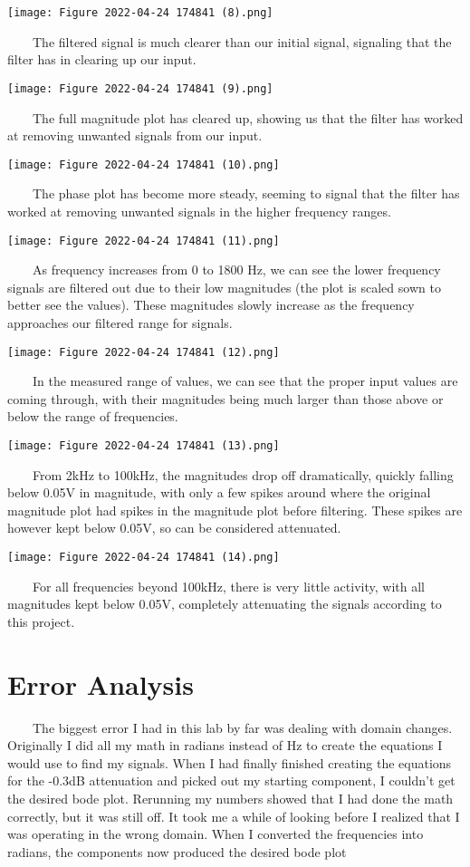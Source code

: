 \documentclass[11pt,a4]{article}
\begin{document}
\texttt{[image: Figure 2022-04-24 174841 (8).png]}

\ \ \ \ The filtered signal is much clearer than our initial signal, signaling that the filter has in clearing up our input.

\texttt{[image: Figure 2022-04-24 174841 (9).png]}

\ \ \ \ The full magnitude plot has cleared up, showing us that the filter has worked at removing unwanted signals from our input.

\texttt{[image: Figure 2022-04-24 174841 (10).png]}

\ \ \ \ The phase plot has become more steady, seeming to signal that the filter has worked at removing unwanted signals in the higher frequency ranges.

\texttt{[image: Figure 2022-04-24 174841 (11).png]}

\ \ \ \ As frequency increases from 0 to 1800 Hz, we can see the lower frequency signals are filtered out due to their low magnitudes (the plot is scaled sown to better see the values). These magnitudes slowly increase as the frequency approaches our filtered range for signals.

\texttt{[image: Figure 2022-04-24 174841 (12).png]}

\ \ \ \ In the measured range of values, we can see that the proper input values are coming through, with their magnitudes being much larger than those above or below the range of frequencies.

\texttt{[image: Figure 2022-04-24 174841 (13).png]}

\ \ \ \ From 2kHz to 100kHz, the magnitudes drop off dramatically, quickly falling below 0.05V in magnitude, with only a few spikes around where the original magnitude plot had spikes in the magnitude plot before filtering. These spikes are however kept below 0.05V, so can be considered attenuated.

\texttt{[image: Figure 2022-04-24 174841 (14).png]}

\ \ \ \ For all frequencies beyond 100kHz, there is very little activity, with all magnitudes kept below 0.05V, completely attenuating the signals according to this project.


\section{Error Analysis}

\ \ \ \ The biggest error I had in this lab by far was dealing with domain changes. Originally I did all my math in radians instead of Hz to create the equations I would use to find my signals. When I had finally finished creating the equations for the -0.3dB attenuation and picked out my starting component, I couldn't get the desired bode plot. Rerunning my numbers showed that I had done the math correctly, but it was still off. It took me a while of looking before I realized that I was operating in the wrong domain. When I converted the frequencies into radians, the components now produced the desired bode plot
\end{document}
